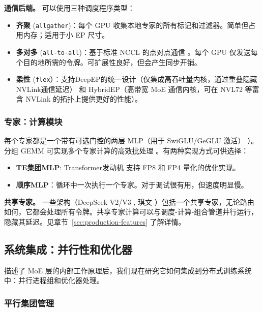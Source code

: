\documentclass[10pt,logo,copyright]{nvidiatechreport_zh}
\begin{document}
\textbf{通信后端。} 可以使用三种调度程序类型：
\begin{itemize}
    \item \textbf{齐聚} (\texttt{allgather})：每个 GPU 收集本地专家的所有标记和过滤器。简单但占用内存；适用于小 EP 尺寸。
    \item \textbf{多对多} (\texttt{all-to-all})：基于标准 NCCL 的点对点通信 \cite{lepikhin2020gshard}。每个 GPU 仅发送每个目的地所需的令牌。可扩展性良好，但会产生同步开销。
    \item \textbf{柔性} (\texttt{flex}）：支持DeepEP的统一设计（仅集成高吞吐量内核，通过重叠隐藏NVLink通信延迟） \cite{deepep2025} 和 HybridEP（高带宽 MoE 通信内核，可在 NVL72 等富含 NVLink 的拓扑上提供更好的性能）。
\end{itemize}

\subsubsection{专家：计算模块}

每个专家都是一个带有可选门控的两层 MLP（用于 SwiGLU/GeGLU 激活） \cite{shazeer2020glu}）。分组 GEMM 可实现多个专家计算的高效批处理 \cite{megablocks,hwang2023tutel}。有两种实现方式可供选择：

\begin{itemize}
    \item \textbf{TE集团MLP}: Transformer发动机 \cite{nvidia_transformer_engine} 支持 FP8 和 FP4 量化的优化实现。
    \item \textbf{顺序MLP}：循环中一次执行一个专家。对于调试很有用，但速度明显慢。
\end{itemize}

\textbf{共享专家。} 一些架构（DeepSeek-V2/V3 \cite{deepseekai2024deepseekv2strongeconomicalefficient,deepseekai2025deepseekv3technicalreport}, 琪文 \cite{qwen2025qwen25technicalreport}）包括一个共享专家，无论路由如何，它都会处理所有令牌。共享专家计算可以与调度-计算-组合管道并行运行，隐藏其延迟。见章节~\ref{sec:production-features} 了解详情。


\subsection{系统集成：并行性和优化器}\label{sec:moe-system-integration}

描述了 MoE 层的内部工作原理后，我们现在研究它如何集成到分布式训练系统中：并行进程组和优化器处理。

\subsubsection{平行集团管理}
\end{document}
